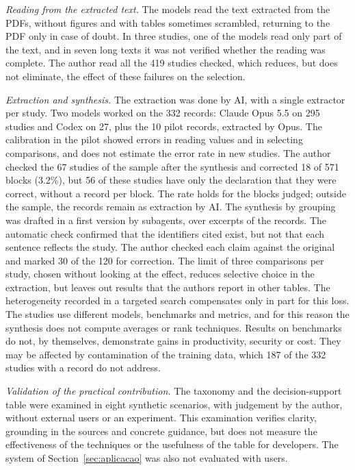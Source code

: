 \textit{Reading from the extracted text.} The models read the text extracted from the PDFs, without figures and with tables sometimes
scrambled, returning to the PDF only in case of doubt. In three studies, one of the models read only part of the text, and
in seven long texts it was not verified whether the reading was complete. The author read all the 419 studies checked, which reduces,
but does not eliminate, the effect of these failures on the selection.

\textit{Extraction and synthesis.} The extraction was done by AI, with a single extractor per study. Two models
worked on the 332 records: Claude Opus 5.5 on 295 studies and Codex on 27, plus the 10 pilot records,
extracted by Opus. The calibration in the pilot
showed errors in reading values and in selecting comparisons, and does not estimate the error rate in new studies. The author checked the 67
studies of the sample after the synthesis and corrected 18 of 571 blocks (3.2\%), but 56 of these studies have only the
declaration that they were correct, without a record per block. The rate holds for the blocks judged; outside the sample, the records remain
as extraction by AI. The synthesis by grouping was drafted in a first
version by subagents, over excerpts of the records. The automatic check confirmed that the identifiers
cited exist, but not that each sentence reflects the study. The author checked each claim
against the original and marked 30 of the 120 for correction. The limit of three comparisons per study, chosen without looking at the effect, reduces selective choice in the
extraction, but leaves out results that the authors report in other tables. The heterogeneity recorded in a
targeted search compensates only in part for this loss. The studies use different models, benchmarks and
metrics, and for this reason the synthesis does not compute averages or rank techniques. Results on benchmarks do not,
by themselves, demonstrate gains in productivity, security or cost. They may be affected by contamination of the
training data, which 187 of the 332 studies with a record do not address.

\textit{Validation of the practical contribution.} The taxonomy and the decision-support table were examined in eight synthetic
scenarios, with judgement by the author, without external users or an experiment. This examination verifies clarity, grounding in the sources and concrete guidance, but
does not measure the effectiveness of the techniques or the usefulness of the table for developers. The system of
Section~\ref{sec:aplicacao} was also not evaluated with users.

